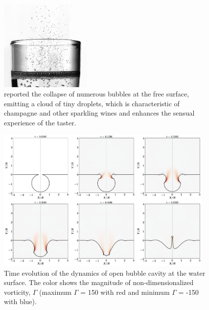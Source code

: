 \documentclass[a4paper,10pt]{article}
\begin{document}
\begin{figure}[H]
	\begin{center}
		\includegraphics[width=0.4\textwidth]{champagne.jpg}
		\caption{\citet{ghabache2016evaporation} reported the collapse of numerous bubbles at the free surface, emitting a cloud of tiny droplets, which is characteristic of champagne and other sparkling wines and enhances the sensual experience of the taster.}
		\label{fig:champange}
	\end{center}
\end{figure}

\begin{figure}[H]
\begin{center}
 \includegraphics[width=0.95\textwidth]{temporal.png}
 \caption{Time evolution of the dynamics of open bubble cavity at the water surface. The color shows the magnitude of non-dimensionalized vorticity, $\Gamma$ (maximum $\Gamma$ = 150 with red and minimum $\Gamma$ = -150 with blue).}
 \label{Figure::Typical}
\end{center}
\end{figure}
\end{document}
